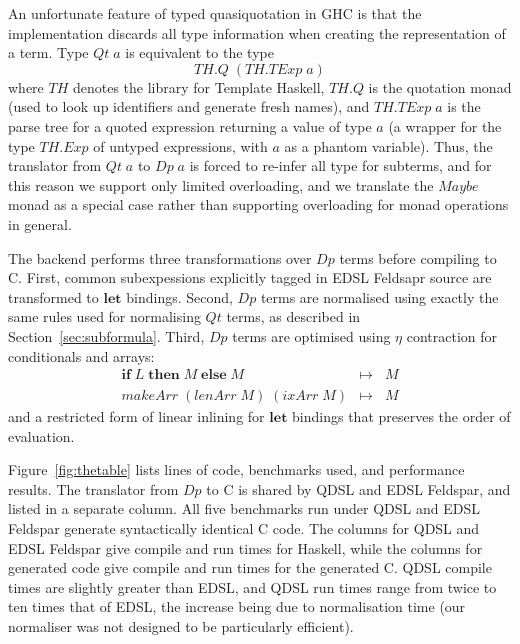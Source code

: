 \documentclass[authoryear,9pt]{sigplanconf}
\newcommand{\Conid}[1]{\mathit{#1}}
\newcommand{\Varid}[1]{\mathit{#1}}
\newcommand{\rewrite}[1]{\mathbin{\mapsto_{#1}}}
\begin{document}
An unfortunate feature of typed quasiquotation in GHC is that the
implementation discards all type information when creating the
representation of a term.  Type \ensuremath{\Conid{Qt}\;\Varid{a}} is equivalent to the type
\[
\ensuremath{\Conid{\Conid{TH}.Q}\;(\Conid{\Conid{TH}.TExp}\;\Varid{a})}
\]
where \ensuremath{\Conid{TH}} denotes the library for Template Haskell, \ensuremath{\Conid{\Conid{TH}.Q}} is the
quotation monad (used to look up identifiers and
generate fresh names), and \ensuremath{\Conid{\Conid{TH}.TExp}\;\Varid{a}} is the parse tree for a quoted
expression returning a value of type \ensuremath{\Varid{a}} (a wrapper for the type
\ensuremath{\Conid{\Conid{TH}.Exp}} of untyped expressions, with \ensuremath{\Varid{a}} as a phantom variable).
Thus, the
translator from \ensuremath{\Conid{Qt}\;\Varid{a}} to \ensuremath{\Conid{Dp}\;\Varid{a}} is forced to re-infer all type for
subterms, and for this reason we support only limited overloading, and we
translate the \ensuremath{\Conid{Maybe}} monad as a special case rather than supporting
overloading for monad operations in general.

The backend performs three transformations over \ensuremath{\Conid{Dp}} terms
before compiling to C. First, common subexpessions explicitly
tagged in EDSL Feldsapr source are transformed to \ensuremath{\mathbf{let}} bindings.
Second, \ensuremath{\Conid{Dp}} terms are normalised using exactly the same rules
used for normalising \ensuremath{\Conid{Qt}} terms, as described in Section~\ref{sec:subformula}.
Third, \ensuremath{\Conid{Dp}} terms are optimised using $\eta$ contraction for
conditionals and arrays:
\[
\begin{array}{rcl}
          \ensuremath{\mathbf{if}\;\Conid{L}\;\mathbf{then}\;\Conid{M}\;\mathbf{else}\;\Conid{M}} & \rewrite{} & M \\
\ensuremath{\Varid{makeArr}\;(\Varid{lenArr}\;\Conid{M})\;(\Varid{ixArr}\;\Conid{M})} & \rewrite{} & M
\end{array}
\]
and a restricted form of linear inlining for \ensuremath{\mathbf{let}} bindings
that preserves the order of evaluation.



Figure~\ref{fig:thetable} lists lines of code,
benchmarks used,
and performance results.
The translator from \ensuremath{\Conid{Dp}} to C is shared by QDSL and EDSL Feldspar,
and listed in a separate column.
All five benchmarks run under QDSL and EDSL Feldspar generate
syntactically identical C code.
The columns for QDSL and EDSL Feldspar give compile and run
times for Haskell, while the columns for generated code
give compile and run times for the generated C.
QDSL compile times are slightly greater than EDSL,
and QDSL run times range from twice to ten times that of EDSL,
the increase being due to normalisation time
(our normaliser was not designed to be particularly efficient).
\end{document}
